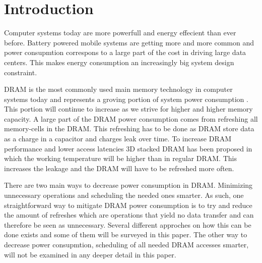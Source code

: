 \section{Introduction}
\label{sec:int}
Computer systems today are more powerfull and energy effecient than ever before. Battery powered mobile systems are getting more and more common and power consupmtion correspons to a large part of the cost in driving large data centers. This makes energy consumption an increasingly big system design constraint.

DRAM is the most commonly used main memory technology in computer systems today and represents a groving portion of system power consumption \cite{exascale}. This portion will continue to increase as we strive for higher and higher memory capacity. A large part of the DRAM power consumption comes from refreshing all memory-cells in the DRAM. This refreshing has to be done as DRAM store data as a charge in a capacitor and charges leak over time. To increase DRAM performance and lower access latencies 3D stacked DRAM has been proposed in which the working temperature will be higher than in regular DRAM. This increases the leakage and the DRAM will have to be refreshed more often.   

There are two main ways to decrease power consumption in DRAM. Minimizing unnecessary operations and scheduling the needed ones smarter. As such, one straightforward way to mitigate DRAM power consumption is to try and reduce the amount of refreshes which are operations that yield no data transfer and can therefore be seen as unnecessary. Several different approches on how this can be done exists and some of them will be surveyed in this paper. The other way to decrease power consupmtion, scheduling of all needed DRAM accesses smarter, will not be examined in any deeper detail in this paper.  
